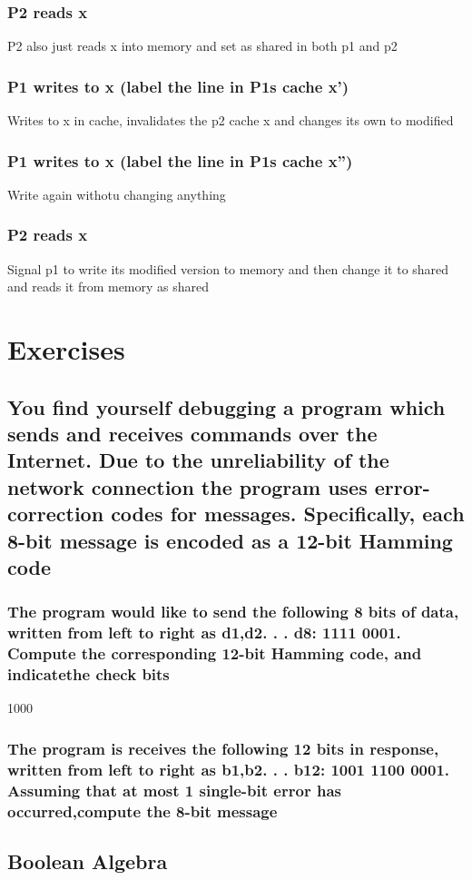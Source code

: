 \documentclass[12pt, a4paper]{article}
\begin{document}
			\subsubsection{P2 reads x}
				P2 also just reads x into memory and set as shared in both p1 and p2
			\subsubsection{P1 writes to x (label the line in P1s cache x')}
				Writes to x in cache, invalidates the p2 cache x and changes its own to modified
			\subsubsection{P1 writes to x (label the line in P1s cache x'')}
				Write again withotu changing anything
			\subsubsection{P2 reads x}
				Signal p1 to write its modified version to memory and then change it to shared and reads it from memory as shared
	\section{Exercises}
		\subsection{You find yourself debugging a program which sends and receives commands over the Internet. Due to the unreliability of the network connection the program uses error-correction codes for messages. Specifically, each 8-bit message is encoded as a 12-bit Hamming code}
			\subsubsection{The program would like to send the following 8 bits of data, written from left to right as d1,d2. . . d8: 1111 0001. Compute the corresponding 12-bit Hamming code, and indicatethe check bits}
				1000
			\subsubsection{The program is receives the following 12 bits in response, written from left to right as b1,b2. . . b12: 1001 1100 0001. Assuming that at most 1 single-bit error has occurred,compute the 8-bit message}
		\subsection{Boolean Algebra}
\end{document}
